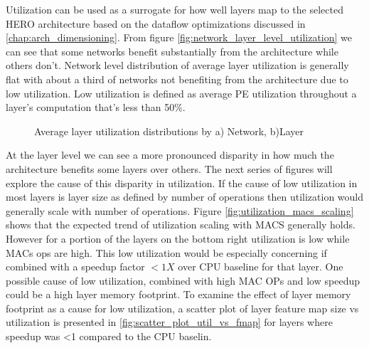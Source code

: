 Utilization can be used as a surrogate for how well layers map to the selected
HERO architecture based on the dataflow optimizations discussed in
\autoref{chap:arch_dimensioning}. From figure
\autoref{fig:network_layer_level_utilization} we can see that some networks benefit substantially from the architecture while
others don't. Network level distribution of average layer utilization is generally flat with
about a third of networks not benefiting from the architecture due to low
utilization. Low utilization is defined as average PE utilization throughout a
layer's computation that's less than 50\%.  


\begin{figure}
    \centering
    \hspace{0.1cm} 
    \caption{Average layer utilization distributions by a) Network, b)Layer}
    \label{fig:network_layer_level_utilization}
\end{figure}

At the layer level we can see a more pronounced disparity in how much the
architecture benefits some layers over others. The next series of figures will
explore the cause of this disparity in utilization. If the cause of low
utilization in most layers is layer size as defined by number of operations then
utilization would generally scale with number of operations. Figure
\autoref{fig:utilization_macs_scaling} shows that the expected trend of
utilization scaling with MACS generally holds. However for a portion of the
layers on the bottom right utilization is low while MACs ops are high. This low
utilization would be especially concerning if combined with a speedup factor
$<1X$ over CPU baseline for that layer. One possible cause of low utilization,
combined with high MAC OPs and low speedup could be a high layer memory
footprint. To examine the effect of layer memory footprint as a cause for low
utilization, a scatter plot of layer feature map size vs utilization is
presented in \autoref{fig:scatter_plot_util_vs_fmap} for layers where speedup
was <1 compared to the CPU baselin. 


